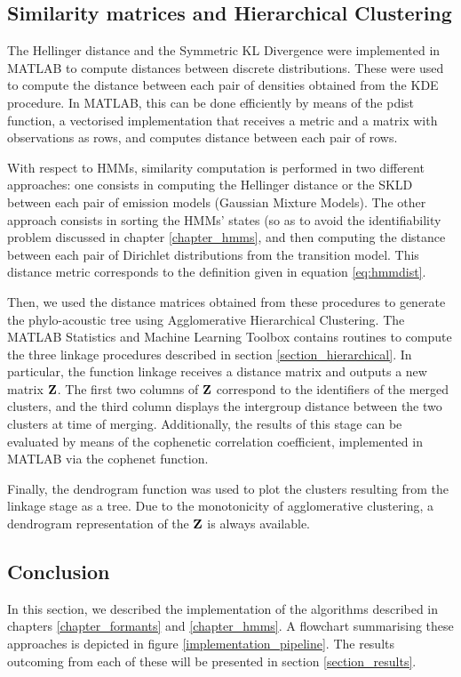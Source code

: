 \documentclass[../main.tex]{subfiles}
\begin{document}
\subsection{Similarity matrices and Hierarchical Clustering}
The Hellinger distance and the Symmetric KL Divergence were implemented in MATLAB to compute distances between discrete distributions. These were used to compute the distance between each pair of densities obtained from the KDE procedure. In MATLAB, this can be done efficiently by means of the pdist function, a vectorised implementation that receives a metric and a matrix with observations as rows, and computes distance between each pair of rows.
\par With respect to HMMs, similarity computation is performed in two different approaches: one consists in computing the Hellinger distance or the SKLD between each pair of emission models (Gaussian Mixture Models). The other approach consists in sorting the HMMs' states (so as to avoid the identifiability problem discussed in chapter \ref{chapter_hmms}, and then computing the distance between each pair of Dirichlet distributions from the transition model. This distance metric corresponds to the definition given in equation \ref{eq:hmmdist}.
\par Then, we used the distance matrices obtained from these procedures to generate the phylo-acoustic tree using Agglomerative Hierarchical Clustering. The MATLAB Statistics and Machine Learning Toolbox contains routines to compute the three linkage procedures described in section \ref{section_hierarchical}. In particular, the function linkage receives a distance matrix and outputs a new matrix $\mathbf{Z}$. The first two columns of $\mathbf{Z}$ correspond to the identifiers of the merged clusters, and the third column displays the intergroup distance between the two clusters at time of merging. Additionally, the results of this stage can be evaluated by means of the cophenetic correlation coefficient, implemented in MATLAB via the cophenet function.
\par Finally, the dendrogram function was used to plot the clusters resulting from the linkage stage as a tree. Due to the monotonicity of agglomerative clustering, a dendrogram representation of the $\mathbf{Z}$ is always available. 

\subsection{Conclusion} \label{section_5conclusion}
In this section, we described the implementation of the algorithms described in chapters  \ref{chapter_formants} and \ref{chapter_hmms}. A flowchart summarising these approaches is depicted in figure \ref{implementation_pipeline}. The results outcoming from each of these will be presented in section \ref{section_results}. 
\end{document}
